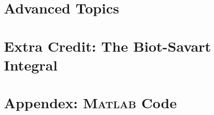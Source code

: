 \documentclass[11pt]{article}
\begin{document}
\subsection{}

\subsection{}

\subsection{}

\subsection{}

\subsection{}

\section{Advanced Topics}

\subsection{}

\subsection{}

\section{Extra Credit: The Biot-Savart Integral}

\section*{Appendex: \textsc{Matlab} Code}

\end{document}

